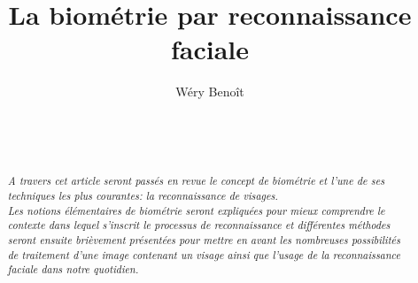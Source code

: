 \documentclass{sig-alternate-05-2015}
\begin{document}
\title{La biométrie par reconnaissance faciale}
\author{
Wéry Benoît\\
       \\
       \\
       \affaddr{\today}\\
}
\maketitle

\begin{abstract}
\textit{
A travers cet article seront passés en revue le concept de biométrie et l'une de ses techniques les plus courantes: la reconnaissance de visages.\\Les notions élémentaires de biométrie seront expliquées pour mieux comprendre le contexte dans lequel s'inscrit le processus de reconnaissance et différentes méthodes seront ensuite brièvement présentées pour mettre en avant les nombreuses possibilités de traitement d'une image contenant un visage ainsi que l'usage de la reconnaissance faciale dans notre quotidien.}
\end{abstract}





%





\appendix
\end{document}
